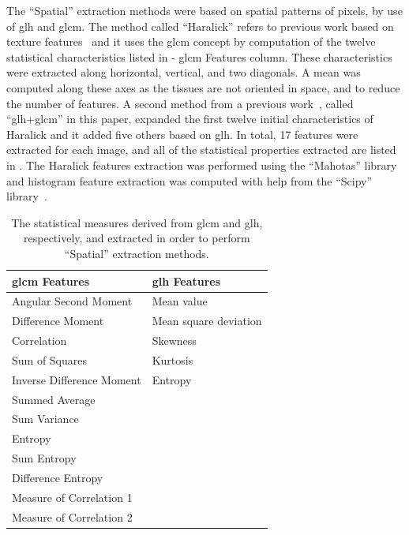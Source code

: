 \documentclass[journal,article,submit,moreauthors,pdftex, applsci]{Definitions/mdpi}
\begin{document}
The “Spatial” extraction methods were based on spatial patterns of pixels, by use of \ac{glh} and \ac{glcm}. The method called “Haralick” refers to previous work based on texture features~\cite{Haralick1973} and it uses the \ac{glcm} concept by computation of the twelve statistical characteristics listed in  - \ac{glcm} Features column. These characteristics were extracted along horizontal, vertical, and two diagonals. A mean was computed along these axes as the tissues are not oriented in space, and to reduce the number of features. A second method from a previous work~\cite{Wiltgen2008}, called “\ac{glh}+\ac{glcm}” in this paper, expanded the first twelve initial characteristics of Haralick and it added five others based on \ac{glh}. In total, 17 features were extracted for each image, and all of the statistical properties extracted are listed in . The Haralick features extraction was performed using the “Mahotas” library~\cite{coelho2012mahotas} and histogram feature extraction was computed with help from the “Scipy” library~\cite{Jones2001}.\par
\begin{table}[H]
    \centering
    \begin{tabular}{ll}
        \hline
        \textbf{\ac{glcm} Features}& \textbf{\ac{glh} Features}     \\ \hline
        Angular Second Moment      & Mean value                     \\
        Difference Moment          & Mean square deviation          \\
        Correlation                & Skewness                       \\
        Sum of Squares             & Kurtosis                       \\
        Inverse Difference Moment  & Entropy                        \\     
        Summed Average             &                                \\    
        Sum Variance               &                                \\    
        Entropy                    &                                \\    
        Sum Entropy                &                                \\    
        Difference Entropy         &                                \\    
        Measure of Correlation 1   &                                \\  
        Measure of Correlation 2   &                                \\ 
    \end{tabular}
    \caption{The statistical measures derived from \ac{glcm} and \ac{glh}, respectively, and extracted in order to perform “Spatial” extraction methods.}
    \label{tab:histogram_features}
\end{table}\par
\end{document}
